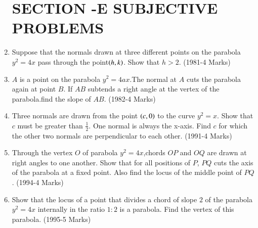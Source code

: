 \documentclass[journal,12pt,twocolumn]{IEEEtran}
\theoremstyle{remark}
\begin{document}
\begin{enumerate}
		\section{SECTION -E SUBJECTIVE PROBLEMS}
	\item Suppose that the normals drawn at three different points on the parabola $y^2=4x$ pass through the point$\left(h,k\right)$. Show that $h>2$.
		\hfill(1981-4 Marks)
		
	\item $A$ is a point on the parabola $y^2=4ax$.The normal at $A$ cuts the parabola again at point $B$. If $AB$ subtends a right angle at the vertex of the parabola.find the slope of $AB$. 
		\hfill(1982-4 Marks)
		
	\item Three normals are drawn from the point $\left(c,0\right)$ to the curve $y^2=x$. Show that $c$ must be greater than $\frac{1}{2}$. One normal is always the x-axis. Find $c$ for which the other two normals are perpendicular to each other. 
	      \hfill(1991-4 Marks)
		
	\item Through the vertex $O$ of parabola $y^2=4x$,chords $OP$ and $OQ$ are drawn at right angles to one another. Show that for all positions of $P$, $PQ$ cuts the axis of the parabola at a fixed point. Also find the locus of the middle point of $PQ$. 
		\hfill(1994-4 Marks)
		
      \item Show that the locus of a point that divides a chord of slope $2$ of the parabola $y^2=4x$ internally in the ratio $1:2$ is a parabola. Find the vertex of this parabola. 
	      \hfill(1995-5 Marks)


\end{enumerate}
\end{document}
